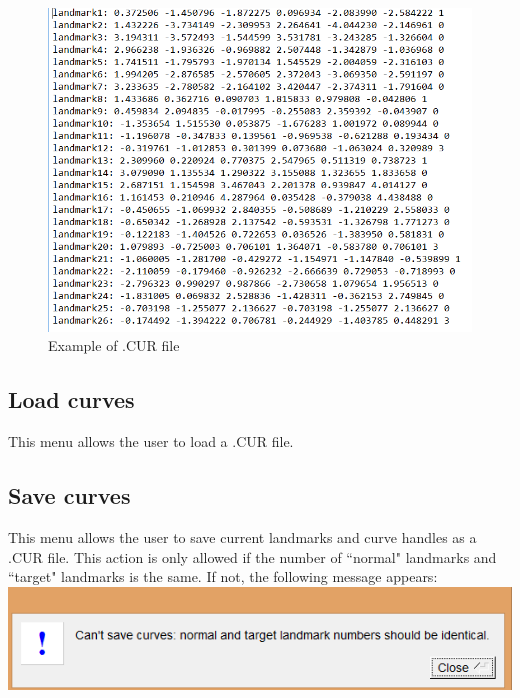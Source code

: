 \begin{figure}[t] 
  \centering
  \includegraphics[scale=0.5]{images/Landmarks/CUR_file.png} 
	\caption{Example of .CUR file}
 
\end{figure}

\subsection{Load curves}
This menu allows the user to load a .CUR file.
\subsection{Save curves}
This menu allows the user to save current landmarks and curve handles as a .CUR file. This action is only allowed if the number of ``normal" landmarks and ``target" landmarks is the same. If not, the following message appears:\\
\includegraphics[scale=0.5]{images/Landmarks/Not_identical.png}

